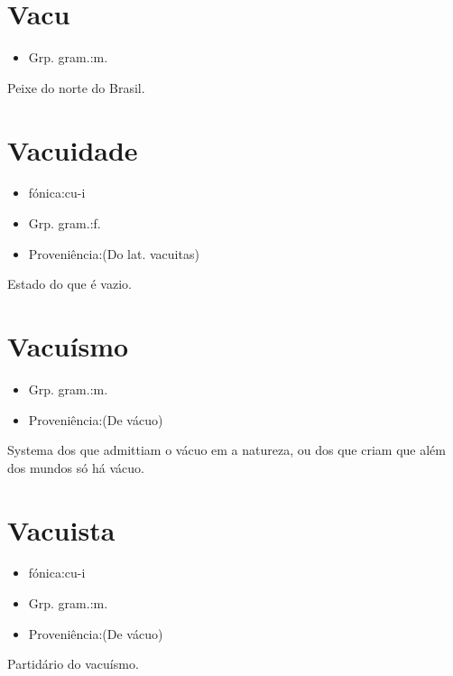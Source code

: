 \documentclass{article}
\begin{document}
\section{Vacu}
\begin{itemize}
\item {Grp. gram.:m.}
\end{itemize}
Peixe do norte do Brasil.
\section{Vacuidade}
\begin{itemize}
\item {fónica:cu-i}
\end{itemize}
\begin{itemize}
\item {Grp. gram.:f.}
\end{itemize}
\begin{itemize}
\item {Proveniência:(Do lat. \textunderscore vacuitas\textunderscore )}
\end{itemize}
Estado do que é vazio.
\section{Vacuísmo}
\begin{itemize}
\item {Grp. gram.:m.}
\end{itemize}
\begin{itemize}
\item {Proveniência:(De \textunderscore vácuo\textunderscore )}
\end{itemize}
Systema dos que admittiam o vácuo em a natureza, ou dos que criam que além dos mundos só há vácuo.
\section{Vacuista}
\begin{itemize}
\item {fónica:cu-i}
\end{itemize}
\begin{itemize}
\item {Grp. gram.:m.}
\end{itemize}
\begin{itemize}
\item {Proveniência:(De \textunderscore vácuo\textunderscore )}
\end{itemize}
Partidário do vacuísmo.
\end{document}

